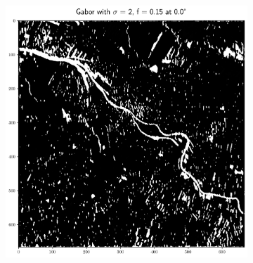 \documentclass[12pt,a4paper, english]{article}
\begin{document}
\begin{figure}[!htbp]
\begin{subfigure}[b]{0.45\textwidth}
         \includegraphics[width=\textwidth]{img/Features_2_015_0.png}
         \label{fig:feat02}
     \end{subfigure}


\end{figure}
\end{document}
